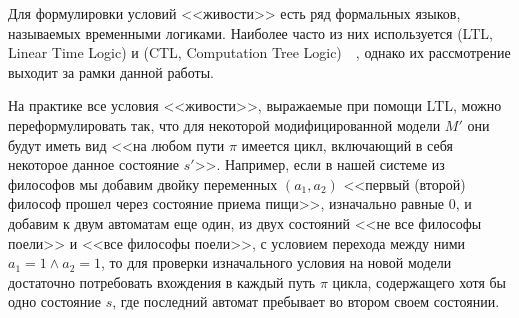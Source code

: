 Для формулировки условий <<живости>> есть ряд формальных языков, называемых временными
логиками. Наиболее часто из них используется  (LTL, Linear
Time Logic) и  (CTL, Computation Tree
Logic)~\cite{Clarke}~\cite{Velder}, однако их рассмотрение выходит за рамки данной
работы.

На практике все условия <<живости>>, выражаемые при помощи LTL, можно переформулировать
так, что для некоторой модифицированной модели $M'$ они будут иметь вид <<на любом пути
$\pi$ имеется цикл, включающий в себя некоторое данное состояние $s'$>>. Например, если в
нашей системе из философов мы добавим двойку переменных $(a_1, a_2)$ <<первый (второй)
философ прошел через состояние приема пищи>>, изначально равные $0$, и добавим к двум
автоматам еще один, из двух состояний <<не все философы поели>> и <<все философы поели>>,
с условием перехода между ними $a_1 = 1 \wedge a_2 = 1$, то для проверки изначального
условия на новой модели достаточно потребовать вхождения в каждый путь $\pi$ цикла,
содержащего хотя бы одно состояние $s$, где последний автомат пребывает во втором своем
состоянии.

